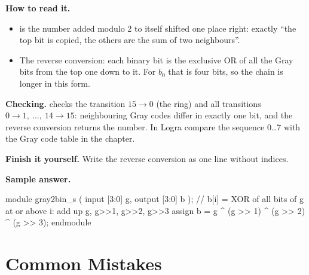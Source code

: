 \textbf{How to read it.}
\begin{itemize}
  \item {} is the number added modulo 2 to itself shifted one place right: exactly ``the top bit is copied, the others are the sum of two neighbours''.
  \item The reverse conversion: each binary bit is the exclusive OR of all the Gray bits from the top one down to it. For $b_0$ that is four bits, so the chain is longer in this form.
\end{itemize}
\textbf{Checking.}  checks the transition $15\to 0$ (the ring) and
all transitions $0\to 1,\ \ldots,\ 14\to 15$: neighbouring Gray codes differ in
exactly one bit, and the reverse conversion returns the number. In Logra compare
the sequence 0\ldots 7 with the Gray code table in the chapter.

\textbf{Finish it yourself.} Write the reverse conversion as one line without
indices.

\textbf{Sample answer.}\par\nopagebreak
\begin{vcode}
module gray2bin_s (
    input  [3:0] g,
    output [3:0] b
);
    // b[i] = XOR of all bits of g at or above i: add up g, g>>1, g>>2, g>>3
    assign b = g ^ (g >> 1) ^ (g >> 2) ^ (g >> 3);
endmodule
\end{vcode}

\section{Common Mistakes}

